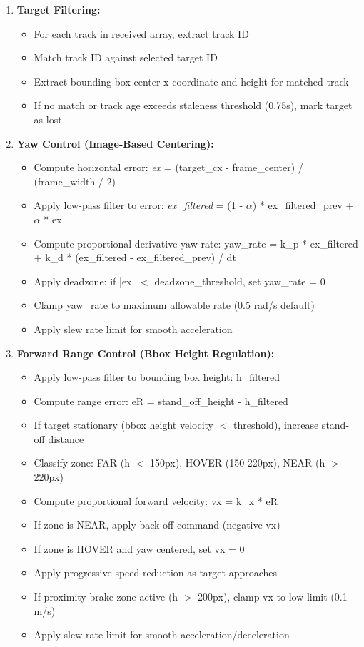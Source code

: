 \documentclass[12pt,a4paper]{report}
\begin{document}
\begin{enumerate}
    \item \textbf{Target Filtering:}
    \begin{itemize}
        \item For each track in received array, extract track ID
        \item Match track ID against selected target ID
        \item Extract bounding box center x-coordinate and height for matched track
        \item If no match or track age exceeds staleness threshold (0.75s), mark target as lost
    \end{itemize}
    \item \textbf{Yaw Control (Image-Based Centering):}
    \begin{itemize}
        \item Compute horizontal error: \textit{ex} = (target\_cx - frame\_center) / (frame\_width / 2)
        \item Apply low-pass filter to error: \textit{ex\_filtered} = (1 - $\alpha$) * ex\_filtered\_prev + $\alpha$ * ex
        \item Compute proportional-derivative yaw rate: yaw\_rate = k\_p * ex\_filtered + k\_d * (ex\_filtered - ex\_filtered\_prev) / dt
        \item Apply deadzone: if |ex| $<$ deadzone\_threshold, set yaw\_rate = 0
        \item Clamp yaw\_rate to maximum allowable rate (0.5 rad/s default)
        \item Apply slew rate limit for smooth acceleration
    \end{itemize}
    \item \textbf{Forward Range Control (Bbox Height Regulation):}
    \begin{itemize}
        \item Apply low-pass filter to bounding box height: h\_filtered
        \item Compute range error: eR = stand\_off\_height - h\_filtered
        \item If target stationary (bbox height velocity $<$ threshold), increase stand-off distance
        \item Classify zone: FAR (h $<$ 150px), HOVER (150-220px), NEAR (h $>$ 220px)
        \item Compute proportional forward velocity: vx = k\_x * eR
        \item If zone is NEAR, apply back-off command (negative vx)
        \item If zone is HOVER and yaw centered, set vx = 0
        \item Apply progressive speed reduction as target approaches
        \item If proximity brake zone active (h $>$ 200px), clamp vx to low limit (0.1 m/s)
        \item Apply slew rate limit for smooth acceleration/deceleration
    \end{itemize}


\end{enumerate}
\end{document}
